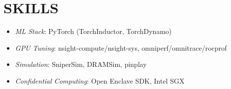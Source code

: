 \section{SKILLS}
    \vspace{-7pt}
    \resumeItemListStart
            \begin{itemize}
            \item[] \textit{ML Stack}: PyTorch (TorchInductor, TorchDynamo)
            \item[] \textit{GPU Tuning}: nsight-compute/nsight-sys, omniperf/omnitrace/rocprof
            \item[] \textit{Simulation}: SniperSim, DRAMSim, pinplay
            \item[] \textit{Confidential Computing}: Open Enclave SDK, Intel SGX
            \end{itemize}

    \resumeItemListEnd